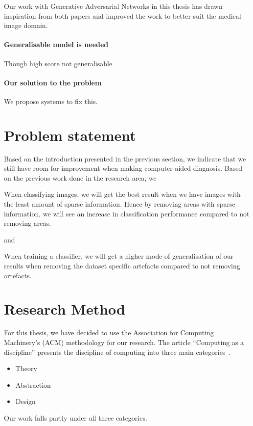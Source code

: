 Our work with Generative Adversarial Networks in this thesis has drawn inspiration from both papers and improved the work to better suit the medical image domain.



\paragraph{Generalisable model is needed}
Though high score not generalisable

\paragraph{Our solution to the problem}
We propose systems to fix this. 
    
    
\section{Problem statement}
Based on the introduction presented in the previous section, we indicate that we still have room for improvement when making computer-aided diagnosis. 
Based on the previous work done in the research area, we 


\noindent
\begin{hyp} \label{hyp:a}
When classifying images, we will get the best result when we have images with the least amount of sparse information. 
Hence by removing areas with sparse information,
we will see an increase in classification performance compared to not removing areas.
\end{hyp}

\noindent
and

\noindent 
\begin{hyp} \label{hyp:b}
When training a classifier, we will get a higher
mode of generalisation of our results when removing the dataset
specific artefacts compared to not removing artefacts.
\end{hyp}
\vspace{5px}


\section{Research Method}
For this thesis, we have decided to use the Association for Computing Machinery's (ACM) methodology for our research. The article ``Computing as a discipline'' presents the discipline of computing into three main categories~\cite{Denning:1989:CD:63238.63239}. 
\begin{itemize}
\item Theory
\item Abstraction
\item Design
\end{itemize}
Our work falls partly under all three categories.

